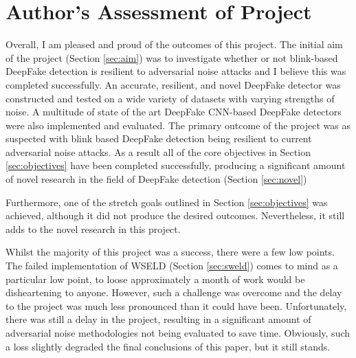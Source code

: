 \section{Author's Assessment of Project}


Overall, I am pleased and proud of the outcomes of this project. The initial aim of the project (Section \ref{sec:aim}) was to investigate whether or not blink-based DeepFake detection is resilient to adversarial noise attacks and I believe this was completed successfully. An accurate, resilient, and novel DeepFake detector was constructed and tested on a wide variety of datasets with varying strengths of noise. A multitude of state of the art DeepFake CNN-based DeepFake detectors were also implemented and evaluated. The primary outcome of the project was as suspected with blink based DeepFake detection being resilient to current adversarial noise attacks. As a result all of the core objectives in Section \ref{sec:objectives} have been completed successfully, producing a significant amount of novel research in the field of DeepFake detection (Section \ref{sec:novel})

Furthermore, one of the stretch goals outlined in Section \ref{sec:objectives} was achieved, although it did not produce the desired outcomes. Nevertheless, it still adds to the novel research in this project. 

Whilst the majority of this project was a success, there were a few low points. The failed implementation of WSELD (Section \ref{sec:sweld}) comes to mind as a particular low point, to loose approximately a month of work would be disheartening to anyone. However, such a challenge was overcome and the delay to the project was much less pronounced than it could have been. Unfortunately, there was still a delay in the project, resulting in a significant amount of adversarial noise methodologies not being evaluated to save time. Obviously, such a loss slightly degraded the final conclusions of this paper, but it still stands.

